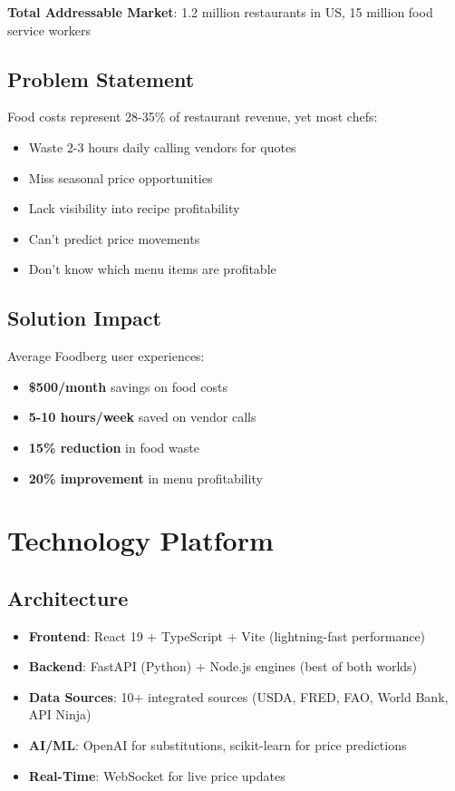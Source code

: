 \documentclass[11pt,a4paper]{article}
\begin{document}
\textbf{Total Addressable Market}: 1.2 million restaurants in US, 15 million food service workers

\subsection{Problem Statement}
Food costs represent 28-35\% of restaurant revenue, yet most chefs:
\begin{itemize}
    \item Waste 2-3 hours daily calling vendors for quotes
    \item Miss seasonal price opportunities
    \item Lack visibility into recipe profitability
    \item Can't predict price movements
    \item Don't know which menu items are profitable
\end{itemize}

\subsection{Solution Impact}
Average Foodberg user experiences:
\begin{itemize}
    \item \textbf{\$500/month} savings on food costs
    \item \textbf{5-10 hours/week} saved on vendor calls
    \item \textbf{15\% reduction} in food waste
    \item \textbf{20\% improvement} in menu profitability
\end{itemize}

\section{Technology Platform}

\subsection{Architecture}
\begin{itemize}
    \item \textbf{Frontend}: React 19 + TypeScript + Vite (lightning-fast performance)
    \item \textbf{Backend}: FastAPI (Python) + Node.js engines (best of both worlds)
    \item \textbf{Data Sources}: 10+ integrated sources (USDA, FRED, FAO, World Bank, API Ninja)
    \item \textbf{AI/ML}: OpenAI for substitutions, scikit-learn for price predictions
    \item \textbf{Real-Time}: WebSocket for live price updates
\end{itemize}
\end{document}
